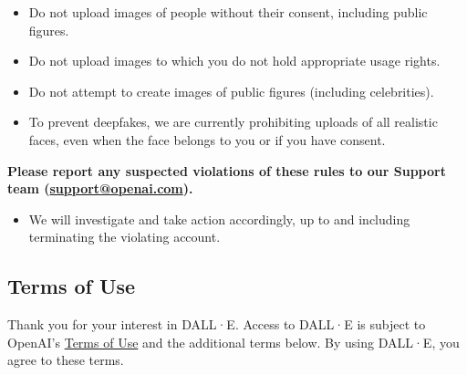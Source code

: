 \begin{itemize}
\item Do not upload images of people without their consent, including public
    figures.
\item Do not upload images to which you do not hold appropriate usage rights.
\item Do not attempt to create images of public figures (including celebrities).
\item To prevent deepfakes, we are currently prohibiting uploads of all
    realistic faces, even when the face belongs to you or if you have consent.
\end{itemize}


\vspace{.5em}\noindent\textbf{Please report any suspected violations of these
    rules to our Support team (\url{support@openai.com}).}

\begin{itemize}
\item We will investigate and take action accordingly, up to and including
    terminating the violating account.
\end{itemize}


\subsection{Terms of Use}
\label{adx:dalle2:terms}

Thank you for your interest in DALL·E. Access to DALL·E is subject to OpenAI's
\href{https://web.archive.org/web/20220729134013/https://openai.com/api/policies/terms/}{Terms
of Use} and the additional terms below. By using DALL·E, you agree to these
terms.

